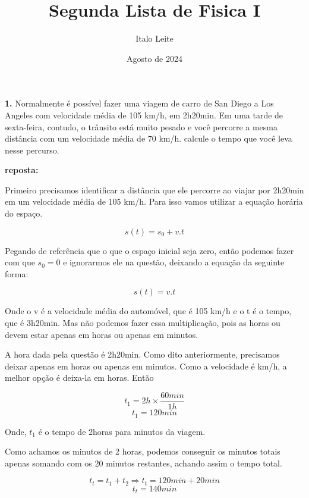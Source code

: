 \documentclass[a4paper, 12pt]{article}
\title{Segunda Lista de Fisica I}
\author{Italo Leite}
\date{Agosto de 2024}
\begin{document}
	
	\maketitle
	
	\begin{flushleft}
		\textbf{1. } Normalmente é possível fazer uma viagem de carro de San Diego a Los Angeles com velocidade média de 105 km/h, em 2h20min. Em uma tarde de sexta-feira, contudo, o trânsito está muito pesado e você percorre a mesma distância com um velocidade média de 70 km/h. calcule o tempo que você leva nesse percurso.
		
		\textbf{reposta:}
		
		Primeiro precisamos identificar a distância que ele percorre ao viajar por 2h20min em um velocidade média de 105 km/h. Para isso vamos utilizar a equação horária do espaço.
		
		\begin{equation*}
			s(t) = s_0 + v.t
		\end{equation*}
		
		Pegando de referência que o que o espaço inicial seja zero, então podemos fazer com que $s_0 = 0$ e ignorarmos ele na questão, deixando a equação da seguinte forma:
		
		\begin{equation*}
			s(t) = v.t
		\end{equation*}
		
		Onde o v é a velocidade média do automóvel, que é 105 km/h e o t é o tempo, que é 3h20min. Mas não podemos fazer essa multiplicação, pois as horas ou devem estar apenas em horas ou apenas em minutos.
		
		A hora dada pela questão é 2h20min. Como dito anteriormente, precisamos deixar apenas em horas ou apenas em minutos. Como a velocidade é km/h, a melhor opção é deixa-la em horas. Então
		
		\begin{equation*}
			t_1=2h \times \frac{60 min}{1 h} 
		\end{equation*}
		\begin{equation*}
			t_1 = 120 min 
		\end{equation*}
		
		Onde, $t_1$ é o tempo de 2horas para minutos da viagem.
		
		Como achamos os minutos de 2 horas, podemos conseguir os minutos totais apenas somando com os 20 minutos restantes, achando assim o tempo total.
		
		\begin{equation*}
			t_t = t_1 + t_2 \Rightarrow t_t = 120 min + 20 min
		\end{equation*}
		\begin{equation*}
			t_t = 140 min
		\end{equation*}
		

\end{flushleft}
\end{document}
